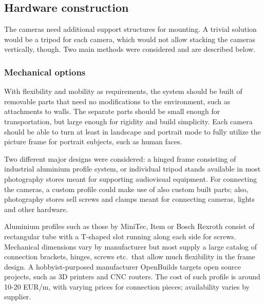 

\subsection{Hardware construction} %

The cameras need additional support structures for mounting.
A trivial solution would be a tripod for each camera, which would not allow stacking the cameras vertically, though.
Two main methods were considered and are described below.

\subsubsection{Mechanical options}

With flexibility and mobility as requirements, the system should be built of removable parts that need no modifications to the environment, such as attachments to walls.
The separate parts should be small enough for transportation, but large enough for rigidity and build simplicity.
Each camera should be able to turn at least in landscape and portrait mode to fully utilize the picture frame for portrait subjects, such as human faces.

Two different major designs were considered: a hinged frame consisting of industrial aluminium profile system, or individual tripod stands available in most photography stores meant for supporting audiovisual equipment.
For connecting the cameras, a custom profile could make use of also custom built parts; also, photography stores sell screws and clamps meant for connecting cameras, lights and other hardware.

Aluminium profiles such as those by MiniTec, Item or Bosch Rexroth consist of rectangular tube with a T-shaped slot running along each side for screws.
Mechanical dimensions vary by manufacturer but most supply a large catalog of connection brackets, hinges, screws etc.\ that allow much flexibility in the frame design.
A hobbyist-purposed manufacturer OpenBuilds targets open source projects, such as 3D printers and CNC routers.
The cost of such profile is around 10-20 EUR/m, with varying prices for connection pieces; availability varies by supplier.

